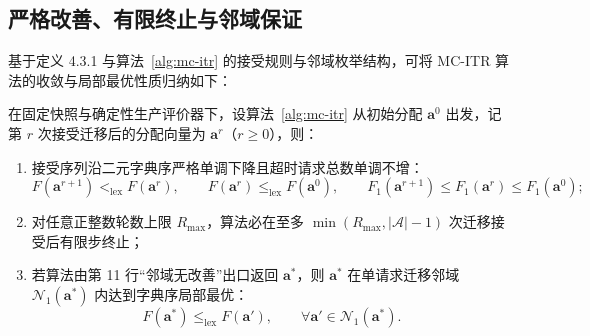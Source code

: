 \subsection{严格改善、有限终止与邻域保证}
\label{sec:mcitr-properties}
\label{sec:ch4-local-global-gap}

基于定义 4.3.1 与算法~\ref{alg:mc-itr} 的接受规则与邻域枚举结构，可将 MC-ITR 算法的收敛与局部最优性质归纳如下：

\begin{theorem}
在固定快照与确定性生产评价器下，设算法~\ref{alg:mc-itr} 从初始分配 $\mathbf{a}^0$ 出发，记第 $r$ 次接受迁移后的分配向量为 $\mathbf{a}^r$（$r\geq 0$），则：
\begin{enumerate}
 \item 接受序列沿二元字典序严格单调下降且超时请求总数单调不增：
 \begin{equation}
  F(\mathbf a^{r+1})<_{\mathrm{lex}}F(\mathbf a^r),\qquad
  F(\mathbf a^r)\leq_{\mathrm{lex}}F(\mathbf a^0),\qquad
  F_1(\mathbf a^{r+1})\leq F_1(\mathbf a^r)\leq F_1(\mathbf a^0);
  \label{eq:ch4-strict-descent}
 \end{equation}
 \item 对任意正整数轮数上限 $R_{\max}$，算法必在至多 $\min(R_{\max},|\mathcal{A}|-1)$ 次迁移接受后有限步终止；
 \item 若算法由第 11 行“邻域无改善”出口返回 $\mathbf{a}^*$，则 $\mathbf{a}^*$ 在单请求迁移邻域 $\mathcal{N}_1(\mathbf{a}^*)$ 内达到字典序局部最优：
 \begin{equation}
  F(\mathbf a^*)\leq_{\mathrm{lex}}F(\mathbf a'),\qquad
  \forall\mathbf a'\in\mathcal N_1(\mathbf a^*).
  \label{eq:ch4-conditional-local-optimum}
 \end{equation}
\end{enumerate}
\end{theorem}

